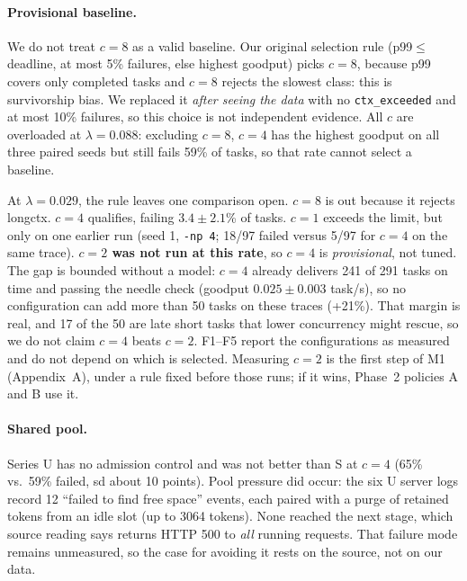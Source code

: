 \documentclass{article}
\begin{document}
\paragraph{Provisional baseline.} We do not treat $c{=}8$ as a valid baseline. Our original selection rule (p99$\le$deadline, at most 5\% failures, else highest goodput) picks $c{=}8$, because p99 covers only completed tasks and $c{=}8$ rejects the slowest class: this is survivorship bias. We replaced it \emph{after seeing the data} with no \texttt{ctx\_exceeded} and at most 10\% failures, so this choice is not independent evidence. All $c$ are overloaded at $\lambda{=}0.088$: excluding $c{=}8$, $c{=}4$ has the highest goodput on all three paired seeds but still fails 59\% of tasks, so that rate cannot select a baseline.

At $\lambda{=}0.029$, the rule leaves one comparison open. $c{=}8$ is out because it rejects longctx. $c{=}4$ qualifies, failing $3.4\pm2.1$\% of tasks. $c{=}1$ exceeds the limit, but only on one earlier run (seed 1, \texttt{-np 4}; 18/97 failed versus 5/97 for $c{=}4$ on the same trace). \textbf{$c{=}2$ was not run at this rate}, so $c{=}4$ is \emph{provisional}, not tuned. The gap is bounded without a model: $c{=}4$ already delivers 241 of 291 tasks on time and passing the needle check (goodput $0.025\pm0.003$ task/s), so no configuration can add more than 50 tasks on these traces (+21\%). That margin is real, and 17 of the 50 are late short tasks that lower concurrency might rescue, so we do not claim $c{=}4$ beats $c{=}2$. F1--F5 report the configurations as measured and do not depend on which is selected. Measuring $c{=}2$ is the first step of M1 (Appendix~A), under a rule fixed before those runs; if it wins, Phase~2 policies A and B use it.

\paragraph{Shared pool.} Series U has no admission control and was not better than S at $c{=}4$ (65\% vs.\ 59\% failed, sd about 10 points). Pool pressure did occur: the six U server logs record 12 ``failed to find free space'' events, each paired with a purge of retained tokens from an idle slot (up to 3064 tokens). None reached the next stage, which source reading says returns HTTP 500 to \emph{all} running requests. That failure mode remains unmeasured, so the case for avoiding it rests on the source, not on our data.

\begin{table}[t]
\caption{Completed tasks by type (S, 3 seeds pooled). Failures are task timeouts unless marked ``ctx'' (\texttt{error\_ctx\_exceeded}). Last row: sd across seeds of the per-run completed count.}
\label{tab:type}
\centering\small

\end{table}
\end{document}
